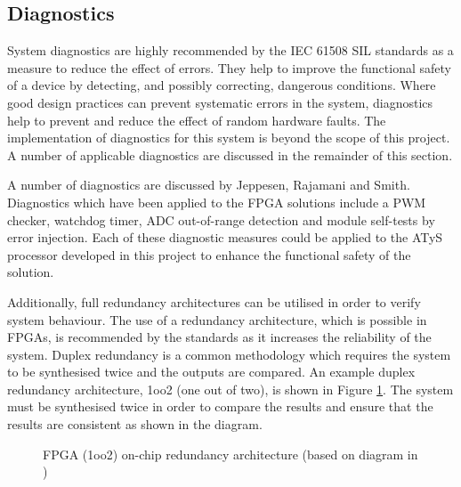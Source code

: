 \subsection{Diagnostics}
\label{diagnostic-section}
System diagnostics are highly recommended by the IEC 61508 SIL standards as a measure to reduce the effect of errors\cite{IEC61508}. They help to improve the functional safety of a device by detecting, and possibly correcting, dangerous conditions\cite{Jeppesen}. Where good design practices can prevent systematic errors in the system, diagnostics help to prevent and reduce the effect of random hardware faults. The implementation of diagnostics for this system is beyond the scope of this project. A number of applicable diagnostics are discussed in the remainder of this section.


A number of diagnostics are discussed by Jeppesen, Rajamani and Smith\cite{Jeppesen}. Diagnostics which have been applied to the FPGA solutions include a PWM checker, watchdog timer, ADC out-of-range detection and module self-tests by error injection\cite{Jeppesen}.
Each of these diagnostic measures could be applied to the ATyS processor developed in this project to enhance the functional safety of the solution.

Additionally, full redundancy architectures can be utilised in order to verify system behaviour\cite{Jeppesen, BorcsokDesign}. The use of a redundancy architecture, which is possible in FPGAs\cite{HayekSRAM}, is recommended by the standards\cite{IEC61508, Borcsok} as it increases the reliability of the system\cite{HayekSafety}. Duplex redundancy is a common methodology which requires the system to be synthesised twice and the outputs are compared\cite{HayekSRAM}. An example duplex redundancy architecture, 1oo2 (one out of two), is shown in Figure \ref{onchip_redundancy}. The system must be synthesised twice in order to compare the results and ensure that the results are consistent as shown in the diagram.



\begin{figure}
    \centering
    
    \caption{FPGA (1oo2) on-chip redundancy architecture (based on diagram in \cite{Borcsok})}
    \label{onchip_redundancy}
\end{figure}


